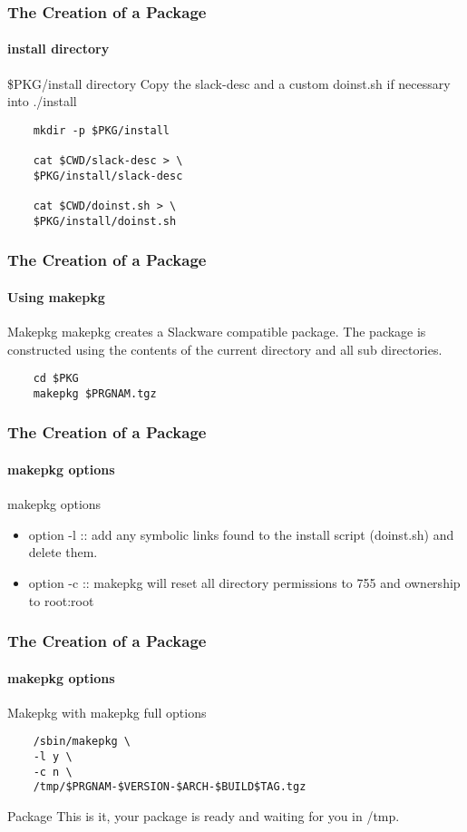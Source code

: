 \documentclass[12pt,hyperref={pdfpagelabels=true}]{beamer}
\begin{document}
\begin{frame}[fragile]
  \frametitle{The Creation of a Package}
  \framesubtitle{install directory}
  \begin{block}{\$PKG/install directory}
    Copy the slack-desc and a custom doinst.sh if necessary into ./install
  \end{block}
  
  \pause
  
  \begin{lstlisting}
    mkdir -p $PKG/install
    
    cat $CWD/slack-desc > \
    $PKG/install/slack-desc
    
    cat $CWD/doinst.sh > \
    $PKG/install/doinst.sh
  \end{lstlisting}
\end{frame}


\begin{frame}[fragile]
  \frametitle{The Creation of a Package}
  \framesubtitle{Using makepkg}
  \begin{block}{Makepkg}
    makepkg creates a Slackware compatible package. The package is constructed
    using the contents of the current directory and all sub directories.
  \end{block}
  
  \pause
  
  \begin{lstlisting}
    cd $PKG
    makepkg $PRGNAM.tgz
  \end{lstlisting}
\end{frame}

\begin{frame}
  \frametitle{The Creation of a Package}
  \framesubtitle{makepkg options}
  \begin{example}{makepkg options}
    \begin{itemize}[<+-| alert@+>]
    \item option -l :: add any symbolic links found to the install script
      (doinst.sh) and delete them.
    \item option -c :: makepkg will reset all directory permissions to 755 and
      ownership to root:root
    \end{itemize}
  \end{example}
\end{frame}

\begin{frame}[fragile]
  \frametitle{The Creation of a Package}
  \framesubtitle{makepkg options}
  \begin{block}{Makepkg}
    with makepkg full options
  \end{block}
  
  \begin{lstlisting}
    /sbin/makepkg \
    -l y \
    -c n \
    /tmp/$PRGNAM-$VERSION-$ARCH-$BUILD$TAG.tgz
  \end{lstlisting}
  
  \pause

  \begin{block}{Package}
    This is it, your package is ready and waiting for you in /tmp.
  \end{block}
\end{frame}
\end{document}
